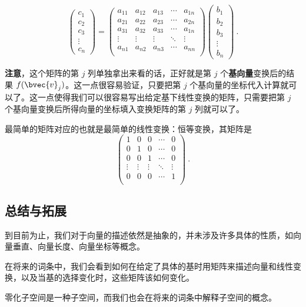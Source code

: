 \begin{equation}
\begin{pmatrix}
c_1\\c_2\\c_3\\\vdots\\c_n
\end{pmatrix}
=
    \begin{pmatrix}
    a_{11}&a_{12}&a_{13}&\cdots&a_{1n}\\
    a_{21}&a_{22}&a_{23}&\cdots&a_{2n}\\
    a_{31}&a_{32}&a_{33}&\cdots&a_{1n}\\
    \vdots&\vdots&\vdots&\ddots&\vdots\\
    a_{n1}&a_{n2}&a_{n3}&\cdots&a_{nn}\\
    \end{pmatrix}
    \begin{pmatrix}
    b_1\\b_2\\b_3\\\vdots\\b_n
    \end{pmatrix}~.
\end{equation}

\textbf{注意}，这个矩阵的第 $j$ 列单独拿出来看的话，正好就是第 $j$ 个\textbf{基向量}变换后的结果 $f(\bvec{v}_j)$。这一点很容易验证，只要把第 $j$ 个基向量的坐标代入计算就可以了。这一点使得我们可以很容易写出给定基下线性变换的矩阵，只需要把第 $j$ 个基向量变换后所得向量的坐标填入变换矩阵的第 $j$ 列就可以了。

最简单的矩阵对应的也就是最简单的线性变换：恒等变换，其矩阵是
\begin{equation}
    \begin{pmatrix}
1&0&0&\cdots&0\\
0&1&0&\cdots&0\\
0&0&1&\cdots&0\\
\vdots&\vdots&\vdots&\ddots&\vdots\\
0&0&0&\cdots&1\\
    \end{pmatrix}~.
\end{equation}


\subsection{总结与拓展}

到目前为止，我们对于向量的描述依然是抽象的，并未涉及许多具体的性质，如向量垂直、向量长度、向量坐标等概念。

在将来的词条中，我们会看到如何在给定了具体的基时用矩阵来描述向量和线性变换，以及当基的选择变化时，这些矩阵该如何变化。

零化子空间是一种子空间，而我们也会在将来的词条中解释子空间的概念。
